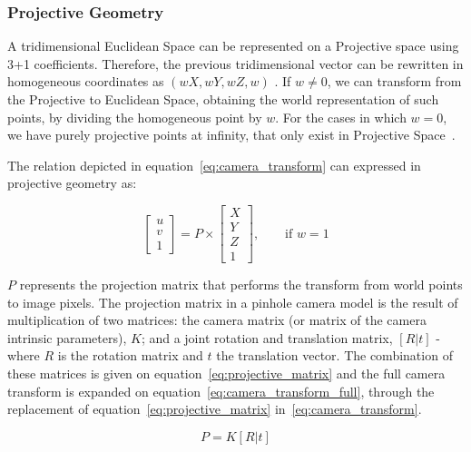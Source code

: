 \subsubsection{Projective Geometry}
A tridimensional Euclidean Space can be represented on a Projective space using 3+1 coefficients. Therefore, the previous tridimensional vector can be rewritten in homogeneous coordinates as $(wX, wY, wZ, w)$ \cite{mvg_book}. If $w \neq 0$, we can transform from the Projective to Euclidean Space, obtaining the world representation of such points, by dividing the homogeneous point by $w$. For the cases in which $w =  0$, we have purely projective points at infinity, that only exist in Projective Space~\cite{mvg_book}. 

The relation depicted in equation~\ref{eq:camera_transform} can expressed in projective geometry as:

\begin{equation}
	\begin{bmatrix}
		u \\ v \\ 1
	\end{bmatrix}
= P \times 
\begin{bmatrix}
		X \\ Y \\ Z \\ 1
	\end{bmatrix}, \qquad \text{if } w = 1
\end{equation}

$P$ represents the projection matrix that performs the transform from world points to image pixels. The projection matrix in a pinhole camera model is the result of multiplication of two matrices: the camera matrix (or matrix of the camera intrinsic parameters), $K$; and a joint rotation and translation matrix, $[R|t]$ - where $R$ is the rotation matrix and $t$ the translation vector. The combination of these matrices is given on equation~\ref{eq:projective_matrix} and the full camera transform is expanded on equation~\ref{eq:camera_transform_full}, through the replacement of equation~\ref{eq:projective_matrix} in~\ref{eq:camera_transform}.

\begin{equation}
	\label{eq:projective_matrix}
	P = K[R|t]
\end{equation}

